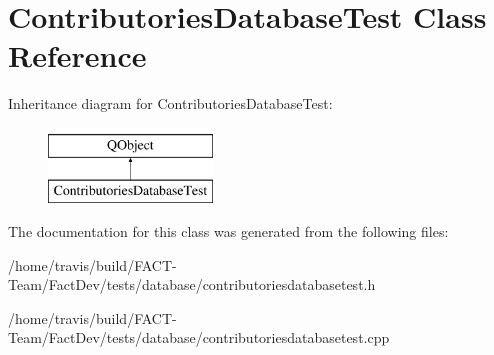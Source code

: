 \hypertarget{classContributoriesDatabaseTest}{\section{Contributories\-Database\-Test Class Reference}
\label{classContributoriesDatabaseTest}
}
Inheritance diagram for Contributories\-Database\-Test\-:\begin{figure}[H]
\begin{center}
\leavevmode
\includegraphics[height=2.000000cm]{d8/df7/classContributoriesDatabaseTest}
\end{center}
\end{figure}


The documentation for this class was generated from the following files\-:\begin{DoxyCompactItemize}
\item 
/home/travis/build/\-F\-A\-C\-T-\/\-Team/\-Fact\-Dev/tests/database/contributoriesdatabasetest.\-h\item 
/home/travis/build/\-F\-A\-C\-T-\/\-Team/\-Fact\-Dev/tests/database/contributoriesdatabasetest.\-cpp\end{DoxyCompactItemize}
